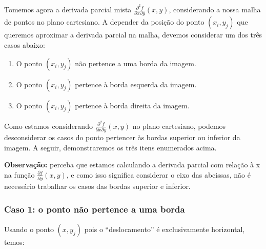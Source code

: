 \documentclass[11pt]{article}
\begin{document}
  \indent\indent Tomemos agora a derivada parcial mista $\frac{\partial^2 f}{\partial x \partial y}(x, y)$, considerando a nossa malha de pontos no plano cartesiano. A depender da posição do ponto  $(x_i, y_j)$ que
  queremos aproximar a derivada parcial na malha, devemos considerar um dos três casos abaixo:


  \begin{enumerate}[label=\textbf{\arabic*.}]
    \item O ponto $(x_i, y_j)$ não pertence a uma borda da imagem.
    \item O ponto $(x_i, y_j)$ pertence à borda esquerda da imagem.
    \item O ponto $(x_i, y_j)$ pertence à borda direita da imagem.
  \end{enumerate}

  Como estamos considerando $\frac{\partial^2 f}{\partial x \partial y}(x, y)$ no plano cartesiano, podemos desconsiderar os casos do ponto pertencer às bordas superior ou inferior da imagem. A seguir, demonstraremos os três itens
  enumerados acima.

  \textbf{Observação:} perceba que estamos calculando a derivada parcial com relação à x na função $\frac{\partial f}{\partial y}(x, y)$, e como isso significa considerar o eixo das abcissas, não é necessário trabalhar os
  casos das bordas superior e inferior.


  \subsubsection{Caso 1: o ponto não pertence a uma borda}

  \indent\indent Usando o ponto $(x, y_j)$ pois o ``deslocamento'' é exclusivamente horizontal, temos:
\end{document}
